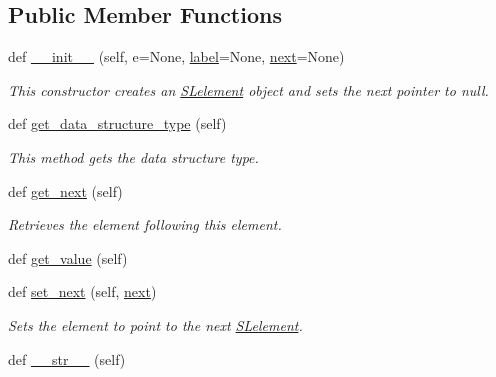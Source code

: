 \subsection*{Public Member Functions}
\begin{DoxyCompactItemize}
\item 
def \mbox{\hyperlink{class_bridges_1_1_s_lelement_1_1_s_lelement_a650ebc16d0b6c365c0f729fd539c6d23}{\+\_\+\+\_\+init\+\_\+\+\_\+}} (self, e=None, \mbox{\hyperlink{class_bridges_1_1_element_1_1_element_a301fe5be8cf72b2c62f6a218feeb9166}{label}}=None, \mbox{\hyperlink{class_bridges_1_1_s_lelement_1_1_s_lelement_a650935f5a68b49de4c222cc4c8b0c778}{next}}=None)
\begin{DoxyCompactList}\small\item\em This constructor creates an \mbox{\hyperlink{class_bridges_1_1_s_lelement_1_1_s_lelement}{S\+Lelement}} object and sets the next pointer to null. \end{DoxyCompactList}\item 
def \mbox{\hyperlink{class_bridges_1_1_s_lelement_1_1_s_lelement_aa09c2e0db9849b811230711dc42f2e92}{get\+\_\+data\+\_\+structure\+\_\+type}} (self)
\begin{DoxyCompactList}\small\item\em This method gets the data structure type. \end{DoxyCompactList}\item 
def \mbox{\hyperlink{class_bridges_1_1_s_lelement_1_1_s_lelement_a754545c884b869be4b51e29d17d0797a}{get\+\_\+next}} (self)
\begin{DoxyCompactList}\small\item\em Retrieves the element following this element. \end{DoxyCompactList}\item 
def \mbox{\hyperlink{class_bridges_1_1_s_lelement_1_1_s_lelement_a0b40a1383c849d546f557e126aad5198}{get\+\_\+value}} (self)
\item 
def \mbox{\hyperlink{class_bridges_1_1_s_lelement_1_1_s_lelement_a2f1a7c6a872fda23e3747cdf3b3906d9}{set\+\_\+next}} (self, \mbox{\hyperlink{class_bridges_1_1_s_lelement_1_1_s_lelement_a650935f5a68b49de4c222cc4c8b0c778}{next}})
\begin{DoxyCompactList}\small\item\em Sets the element to point to the next \mbox{\hyperlink{class_bridges_1_1_s_lelement_1_1_s_lelement}{S\+Lelement}}. \end{DoxyCompactList}\item 
def \mbox{\hyperlink{class_bridges_1_1_s_lelement_1_1_s_lelement_a5c9b157e36efdec0fcc713fb2c26a278}{\+\_\+\+\_\+str\+\_\+\+\_\+}} (self)

\end{DoxyCompactItemize}
